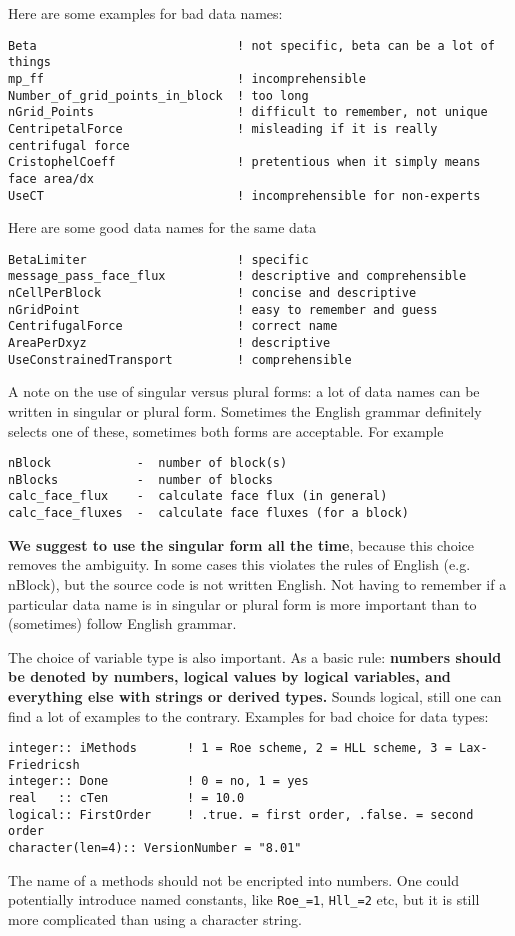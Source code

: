 \documentclass{article}
\begin{document}
Here are some examples for bad data names:
\begin{verbatim}
Beta                            ! not specific, beta can be a lot of things
mp_ff                           ! incomprehensible
Number_of_grid_points_in_block  ! too long
nGrid_Points                    ! difficult to remember, not unique
CentripetalForce                ! misleading if it is really centrifugal force
CristophelCoeff                 ! pretentious when it simply means face area/dx
UseCT                           ! incomprehensible for non-experts
\end{verbatim}
Here are some good data names for the same data
\begin{verbatim}
BetaLimiter                     ! specific
message_pass_face_flux          ! descriptive and comprehensible
nCellPerBlock                   ! concise and descriptive
nGridPoint                      ! easy to remember and guess
CentrifugalForce                ! correct name
AreaPerDxyz                     ! descriptive
UseConstrainedTransport         ! comprehensible
\end{verbatim}
A note on the use of singular versus plural forms: 
a lot of data names can be written in singular or plural form. 
Sometimes the English grammar definitely selects one of these, sometimes
both forms are acceptable. For example
\begin{verbatim}
nBlock            -  number of block(s) 
nBlocks           -  number of blocks
calc_face_flux    -  calculate face flux (in general)
calc_face_fluxes  -  calculate face fluxes (for a block)
\end{verbatim}
{\bf We suggest to use the singular form all the time}, because
this choice removes the ambiguity. In some cases this violates the rules of
English (e.g. nBlock), but the source code is not written English. 
Not having to remember if a particular data name is in singular 
or plural form is more important than to (sometimes) follow English grammar.

The choice of variable type is also important. As a basic rule:
{\bf numbers should be denoted by numbers, logical values by logical variables,
and everything else with strings or derived types.}
Sounds logical, still one can find a lot of examples to the contrary.
Examples for bad choice for data types:
\begin{verbatim}
integer:: iMethods       ! 1 = Roe scheme, 2 = HLL scheme, 3 = Lax-Friedricsh
integer:: Done           ! 0 = no, 1 = yes
real   :: cTen           ! = 10.0
logical:: FirstOrder     ! .true. = first order, .false. = second order
character(len=4):: VersionNumber = "8.01"
\end{verbatim}
The name of a methods should not be encripted into numbers. One could
potentially introduce named constants, like {\tt Roe\_=1}, {\tt Hll\_=2} etc,
but it is still more complicated than using a character string.
\end{document}
